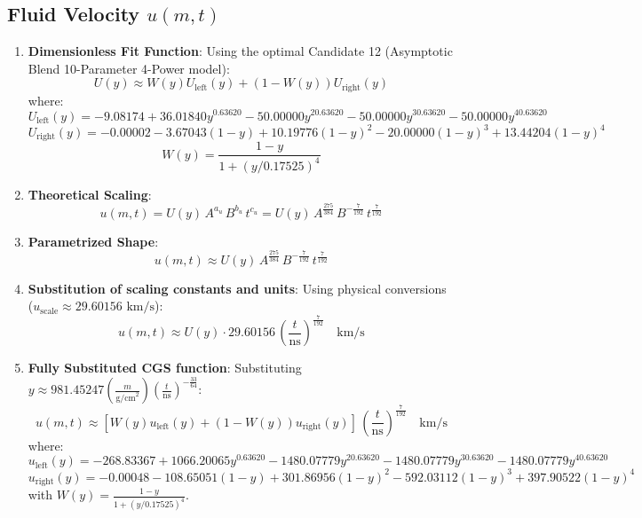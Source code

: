\documentclass[11pt]{article}
\begin{document}
\subsection{Fluid Velocity $u(m,t)$}
\begin{enumerate}
    \item \textbf{Dimensionless Fit Function}:
    Using the optimal Candidate 12 (Asymptotic Blend 10-Parameter 4-Power model):
    $$U(y) \approx W(y) U_{\text{left}}(y) + (1 - W(y)) U_{\text{right}}(y)$$
    where:
    $$U_{\text{left}}(y) = -9.08174 + 36.01840 y^{0.63620} - 50.00000 y^{2 0.63620} - 50.00000 y^{3 0.63620} - 50.00000 y^{4 0.63620}$$
    $$U_{\text{right}}(y) = -0.00002 - 3.67043 (1-y) + 10.19776 (1-y)^2 - 20.00000 (1-y)^3 + 13.44204 (1-y)^4$$
    $$W(y) = \frac{1 - y}{1 + \left( y / 0.17525 \right)^4}$$
    
    \item \textbf{Theoretical Scaling}:
    $$u(m,t) = U(y) \, A^{a_u} \, B^{b_u} \, t^{c_u} = U(y) \, A^{\frac{275}{384}} \, B^{-\frac{7}{192}} \, t^{\frac{7}{192}}$$
    
    \item \textbf{Parametrized Shape}:
    $$u(m,t) \approx U(y) \, A^{\frac{275}{384}} \, B^{-\frac{7}{192}} \, t^{\frac{7}{192}}$$
    
    \item \textbf{Substitution of scaling constants and units}:
    Using physical conversions ($u_{\text{scale}} \approx 29.60156 \text{ km/s}$):
    $$u(m,t) \approx U(y) \cdot 29.60156 \, \left(\frac{t}{\text{ns}}\right)^{\frac{7}{192}} \quad \text{km/s}$$
    
    \item \textbf{Fully Substituted CGS function}:
    Substituting $y \approx 981.45247 \left(\frac{m}{\text{g/cm}^2}\right) \left(\frac{t}{\text{ns}}\right)^{-\frac{33}{64}}$:
    $$u(m,t) \approx \left[ W(y) u_{\text{left}}(y) + (1-W(y)) u_{\text{right}}(y) \right] \, \left(\frac{t}{\text{ns}}\right)^{\frac{7}{192}} \quad \text{km/s}$$
    where:
    $$u_{\text{left}}(y) = -268.83367 + 1066.20065 y^{0.63620} - 1480.07779 y^{2 0.63620} - 1480.07779 y^{3 0.63620} - 1480.07779 y^{4 0.63620}$$
    $$u_{\text{right}}(y) = -0.00048 - 108.65051 (1-y) + 301.86956 (1-y)^2 - 592.03112 (1-y)^3 + 397.90522 (1-y)^4$$
    with $W(y) = \frac{1 - y}{1 + \left( y / 0.17525 \right)^4}$.
\end{enumerate}
\end{document}
